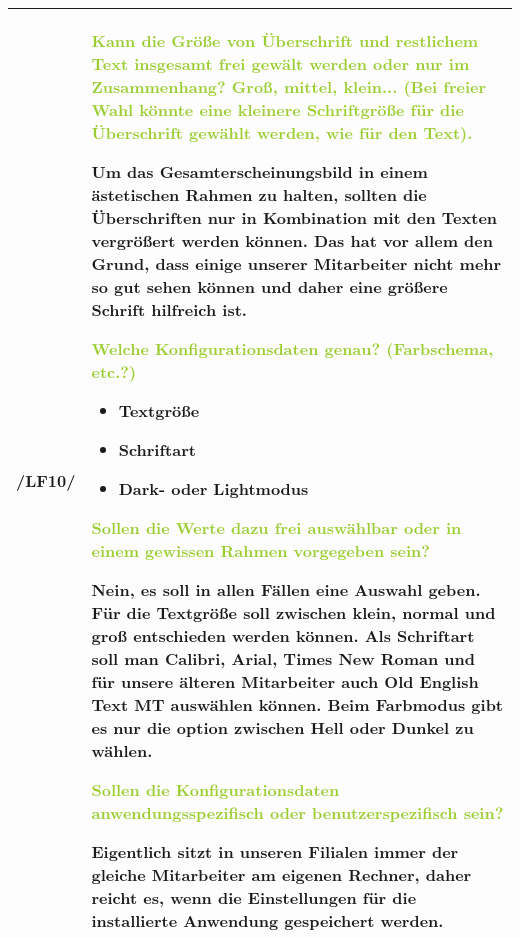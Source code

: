 \begin{tabular}{l | p{13cm}}
    \hline
    /LF10/ & \textcolor{YellowGreen}{Kann die Größe von Überschrift und restlichem Text insgesamt frei gewält werden oder nur im Zusammenhang? Groß, mittel, klein... (Bei freier Wahl könnte eine kleinere Schriftgröße für die Überschrift gewählt werden, wie für den Text).}

    \textcolor{NavyBlue}{Um das Gesamterscheinungsbild in einem ästetischen Rahmen zu halten, sollten die Überschriften nur in Kombination mit den Texten vergrößert werden können. Das hat vor allem den Grund, dass einige unserer Mitarbeiter nicht mehr so gut sehen können und daher eine größere Schrift hilfreich ist.}

    \textcolor{YellowGreen}{Welche Konfigurationsdaten genau? (Farbschema, etc.?)}

    \textcolor{NavyBlue}{
        \begin{itemize}
            \item Textgröße
            \item Schriftart
            \item Dark- oder Lightmodus
        \end{itemize}
    }

    \textcolor{YellowGreen}{Sollen die Werte dazu frei auswählbar oder in einem gewissen Rahmen vorgegeben sein?}

    \textcolor{NavyBlue}{Nein, es soll in allen Fällen eine Auswahl geben. Für die Textgröße soll zwischen klein, normal und groß entschieden werden können.
    Als Schriftart soll man \grqq{}Calibri\grqq{}, \grqq{}Arial\grqq{}, \grqq{}Times New Roman\grqq{} und für unsere älteren Mitarbeiter auch \grqq{}Old English Text MT\grqq{} auswählen können. Beim Farbmodus gibt es nur die option zwischen \grqq{}Hell\grqq{} oder \grqq{}Dunkel\grqq{} zu wählen.}

    \textcolor{YellowGreen}{Sollen die Konfigurationsdaten anwendungsspezifisch oder benutzerspezifisch sein?} 
    
    \textcolor{NavyBlue}{Eigentlich sitzt in unseren Filialen immer der gleiche Mitarbeiter am eigenen Rechner, daher reicht es, wenn die Einstellungen für die installierte Anwendung gespeichert werden.}
    \\
    \hline
\end{tabular}

